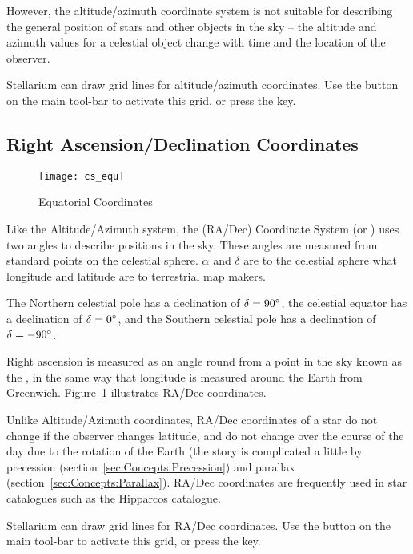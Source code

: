 However, the altitude/azimuth coordinate system is not suitable for
describing the general position of stars and other objects in the sky --
the altitude and azimuth values for a celestial object change with
time and the location of the observer.

Stellarium can draw grid lines for altitude/azimuth coordinates. Use the
button on the main tool-bar to activate this grid, or press the  key.

\subsection{Right Ascension/Declination Coordinates}
\label{sec:Concepts:Equatorial}

\begin{figure}[ht]
\centering\texttt{[image: cs\_equ]}
\caption{Equatorial Coordinates}
\label{fig:EquatorialCoordinates}
\end{figure}

Like the Altitude/Azimuth system, the 
(RA/Dec) Coordinate System (or ) uses two angles to describe positions in the
sky. These angles are measured from standard points on the celestial
sphere.  $\alpha$ and  $\delta$ are to the celestial sphere what
longitude and latitude are to terrestrial map makers.

The Northern celestial pole has a declination of $\delta=90\degree$, the celestial
equator has a declination of $\delta=0\degree$, and the Southern celestial pole has a declination of $\delta=-90\degree$.

Right ascension is measured as an angle round from a point in the sky
known as the , in the same way that longitude
is measured around the Earth from Greenwich. Figure~\ref{fig:EquatorialCoordinates} illustrates
RA/Dec coordinates.

Unlike Altitude/Azimuth coordinates, RA/Dec coordinates of a star do
not change if the observer changes latitude, and do not change over
the course of the day due to the rotation of the Earth (the story is
complicated a little by precession (section~\ref{sec:Concepts:Precession}) and
parallax (section~\ref{sec:Concepts:Parallax}). RA/Dec coordinates are
frequently used in star catalogues such as the Hipparcos catalogue.

Stellarium can draw grid lines for RA/Dec coordinates. Use the button on
the main tool-bar to activate this grid, or press the  key.

